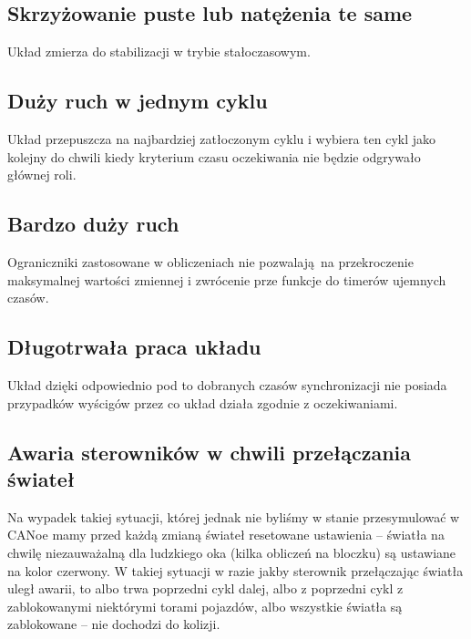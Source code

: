 \documentclass[a4paper, 12pt, titlepage]{article}
\begin{document}
		\subsection{Skrzyżowanie puste lub natężenia te same}
			Układ zmierza do stabilizacji w trybie stałoczasowym.
		\subsection{Duży ruch w jednym cyklu}
			Układ przepuszcza na najbardziej zatłoczonym cyklu i wybiera ten cykl jako kolejny do chwili kiedy kryterium czasu oczekiwania nie będzie odgrywało głównej roli.
		\subsection{Bardzo duży ruch}
			Ograniczniki zastosowane w obliczeniach nie pozwalają na przekroczenie maksymalnej wartości zmiennej i zwrócenie prze funkcje do timerów ujemnych czasów.
		\subsection{Długotrwała praca układu}
			Układ dzięki odpowiednio pod to dobranych czasów synchronizacji nie posiada przypadków wyścigów przez co układ działa zgodnie z oczekiwaniami.
		\subsection{Awaria sterowników w chwili przełączania świateł}
			Na wypadek takiej sytuacji, której jednak nie byliśmy w stanie przesymulować w CANoe mamy przed każdą zmianą świateł resetowane ustawienia -- światła na chwilę niezauważalną dla ludzkiego oka (kilka obliczeń na bloczku) są ustawiane na kolor czerwony. W takiej sytuacji w razie jakby sterownik przełączając światła uległ awarii, to albo trwa poprzedni cykl dalej, albo z poprzedni cykl z zablokowanymi niektórymi torami pojazdów, albo wszystkie światła są zablokowane -- nie dochodzi do kolizji.
\end{document}
